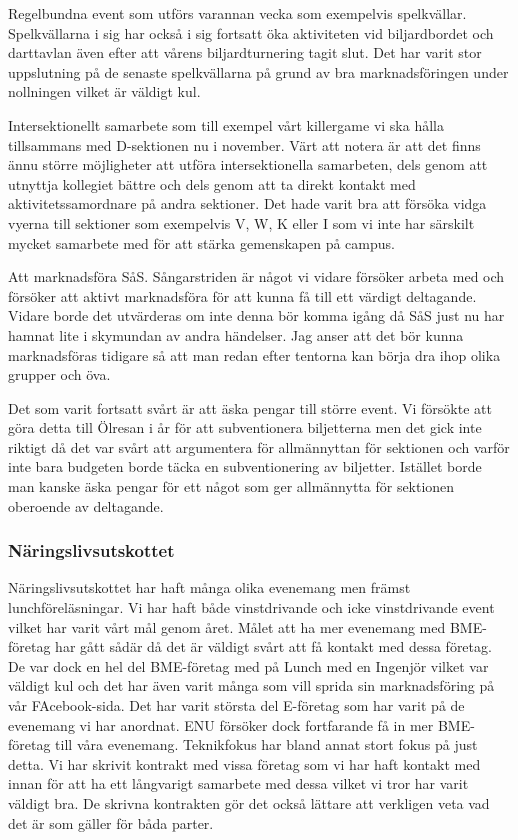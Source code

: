 \documentclass[../_main/handlingar.tex]{subfiles}
\begin{document}
Regelbundna event som utförs varannan vecka som exempelvis spelkvällar. Spelkvällarna i sig har också i sig fortsatt öka aktiviteten vid biljardbordet och darttavlan även efter att vårens biljardturnering tagit slut. Det har varit stor uppslutning på de senaste spelkvällarna på grund av bra marknadsföringen under nollningen vilket är väldigt kul.

Intersektionellt samarbete som till exempel vårt killergame vi ska hålla tillsammans med D-sektionen nu i november. Värt att notera är att det finns ännu större möjligheter att utföra intersektionella samarbeten, dels genom att utnyttja kollegiet bättre och dels genom att ta direkt kontakt med aktivitetssamordnare på andra sektioner. Det hade varit bra att försöka vidga vyerna till sektioner som exempelvis V, W, K eller I som vi inte har särskilt mycket samarbete med för att stärka gemenskapen på campus. 

Att marknadsföra SåS. Sångarstriden är något vi vidare försöker arbeta med och försöker att aktivt marknadsföra för att kunna få till ett värdigt deltagande. Vidare borde det utvärderas om inte denna bör komma igång då SåS just nu har hamnat lite i skymundan av andra händelser. Jag anser att det bör kunna marknadsföras tidigare så att man redan efter tentorna kan börja dra ihop olika grupper och öva. 

Det som varit fortsatt svårt är att äska pengar till större event. Vi försökte att göra detta till Ölresan i år för att subventionera biljetterna men det gick inte riktigt då det var svårt att argumentera för allmännyttan för sektionen och varför inte bara budgeten borde täcka en subventionering av biljetter. Istället borde man kanske äska pengar för ett något som ger allmännytta för sektionen oberoende av deltagande. 

\subsubsection*{Näringslivsutskottet}
Näringslivsutskottet har haft många olika evenemang men främst lunchföreläsningar. Vi har haft både vinstdrivande och icke vinstdrivande event vilket har varit vårt mål genom året. 
Målet att ha mer evenemang med BME-företag har gått sådär då det är väldigt svårt att få kontakt med dessa företag. De var dock en hel del BME-företag med på Lunch med en Ingenjör vilket var väldigt kul och det har även varit många som vill sprida sin marknadsföring på vår FAcebook-sida.
Det har varit största del E-företag som har varit på de evenemang vi har anordnat. ENU försöker dock fortfarande få in mer BME-företag till våra evenemang. Teknikfokus har bland annat stort fokus på just detta.
Vi har skrivit kontrakt med vissa företag som vi har haft kontakt med innan för att ha ett långvarigt samarbete med dessa vilket vi tror har varit väldigt bra. De skrivna kontrakten gör det också lättare att verkligen veta vad det är som gäller för båda parter. 
\end{document}

